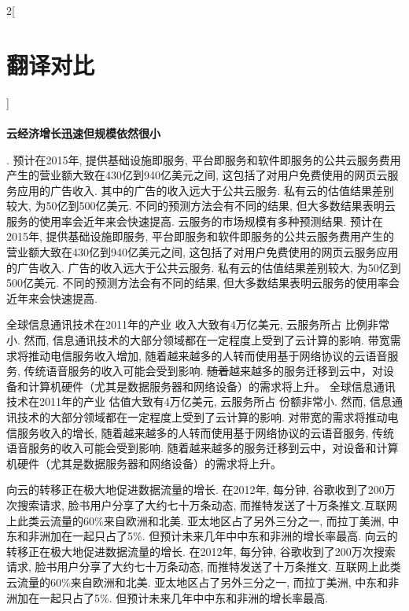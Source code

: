 \documentclass[a4paper, UTF8, 12pt]{article}
\begin{document}
\begin{paracol}{2}[\section{翻译对比}]
    
    \switchcolumn*
    \paragraph{} 
    \switchcolumn
    {\bfseries 云经济增长迅速但规模依然很小}

    . 预计在2015年, 提供基础设施即服务, 平台即服务和软件即服务的公共云服务费用产生的营业额大致在430亿到940亿美元之间, 这包括了对用户免费使用的网页云服务应用的广告收入. {\color{red} 其中的广告}的收入远大于公共云服务. 私有云的估值结果差别较大, 为50亿到500亿美元. {\color{blue} 不同的预测方法会有不同的结果}, 但大多数结果表明云服务的使用率会近年来会快速提高.
    \switchcolumn
    {\color{red} 云服务的市场规模有多种预测结果}. 预计在2015年, 提供基础设施即服务, 平台即服务和软件即服务的公共云服务费用产生的营业额大致在430亿到940亿美元之间, 这包括了对用户免费使用的网页云服务应用的广告收入. {\color{red} 广告}的收入远大于公共云服务. 私有云的估值结果差别较大, 为50亿到500亿美元.  {\color{blue} 不同的预测方法会有不同的结果}, 但大多数结果表明云服务的使用率会近年来会快速提高.
    
    \switchcolumn*
    全球信息通讯技术在2011年的产业{\color{red} 收入}大致有4万亿美元, 云服务所占{\color{red} 比例}非常小. 然而, 信息通讯技术的大部分领域都在一定程度上受到了云计算的影响. {\color{red} 带宽需求将推动电信服务收入增加}, 随着越来越多的人转而使用基于网络协议的云语音服务, 传统语音服务的收入可能会受到影响. {\color{red} \sout{随着}}越来越多的服务迁移到云中，对设备和计算机硬件（尤其是数据服务器和网络设备）的需求将上升。
    \switchcolumn
    全球信息通讯技术在2011年的产业{\color{red} 估值}大致有4万亿美元, 云服务所占{\color{red} 份额}非常小. 然而, 信息通讯技术的大部分领域都在一定程度上受到了云计算的影响. {\color{red} 对带宽的需求将推动电信服务收入的增长}, 随着越来越多的人转而使用基于网络协议的云语音服务, 传统语音服务的收入可能会受到影响. {\color{red} 随着}越来越多的服务迁移到云中，对设备和计算机硬件（尤其是数据服务器和网络设备）的需求将上升。

    \switchcolumn*
    向云的转移正在极大地促进数据流量的增长. 在2012年, 每分钟, 谷歌收到了200万次搜索请求, 脸书用户分享了大约七十万条动态, 而推特发送了十万条推文.互联网上此类云流量的60\%来自欧洲和北美. 亚太地区占了另外三分之一, 而拉丁美洲, 中东和非洲加在一起只占了5\%. 但预计未来几年中中东和非洲的增长率最高.
    \switchcolumn
    向云的转移正在极大地促进数据流量的增长. 在2012年, 每分钟, 谷歌收到了200万次搜索请求, 脸书用户分享了大约七十万条动态, 而推特发送了十万条推文. 互联网上此类云流量的60\%来自欧洲和北美. 亚太地区占了另外三分之一, 而拉丁美洲, 中东和非洲加在一起只占了5\%. 但预计未来几年中中东和非洲的增长率最高.


\end{paracol}
\end{document}
